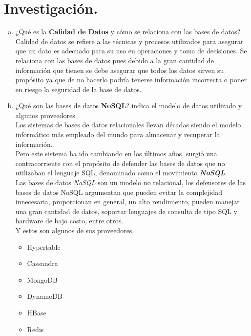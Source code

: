 \documentclass[letterpaper,12pt]{article}
\begin{document}
            \section{Investigación.}
            \begin{enumerate}[a)]

            \item ¿Qué es la \textbf{Calidad de Datos} y cómo se relaciona con las bases de datos? \\

        	Calidad de datos se refiere a las técnicas y procesos utilizados para asegurar que un dato es adecuado para su uso en operaciones y toma de decisiones. Se relaciona con las bases de datos pues debido a la gran cantidad de información que tienen se debe asegurar que todos los datos sirven su propósito ya que de no hacerlo podría tenerse información incorrecta o poner en riesgo la seguridad de la base de datos.

            \item ¿Qué son las bases de datos \textbf{NoSQL}? indica el modelo de datos utilizado y algunos proveedores.\\

         Los sistemas de bases de datos relacionales llevan décadas siendo el modelo informático más empleado del mundo para almacenar y recuperar la información.\\

         Pero este sistema ha ido cambiando en los últimos años, surgió una contracorriente con el propósito de defender las bases de datos que no utilizaban el lenguaje SQL, denominado como el movimiento \textbf{\textit{ NoSQL}}. \\

         Las bases de datos \textit{NoSQL} son un modelo no relacional, los defensores de las bases de datos NoSQL argumentan que pueden evitar la complejidad innecesaria, proporcionan en general, un alto rendimiento, pueden manejar una gran cantidad de datos, soportar lenguajes de consulta de tipo SQL y hardware de bajo costo, entre otros.\\

          Y estos son algunos de sus proveedores.
          \begin{itemize}
            \item Hypertable
            \item Cassandra
            \item MongoDB
            \item DynamoDB
            \item HBase
            \item Redis


\end{itemize}
\end{enumerate}
\end{document}
